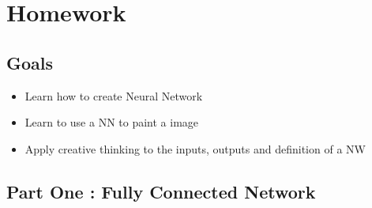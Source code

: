 \documentclass[12pt,a4paper]{article}
\begin{document}
\section{Homework}
\subsection{Goals}
\begin{itemize}
\item Learn how to create Neural Network
\item Learn to use a NN to paint a image
\item Apply creative thinking to the inputs, outputs and definition of a NW
\end{itemize}
\subsection{Part One : Fully Connected Network}
\end{document}
